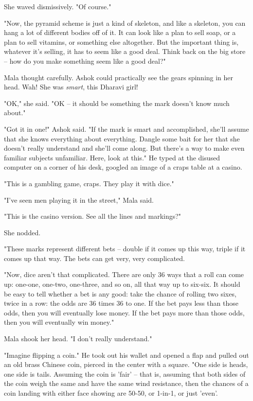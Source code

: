 She waved dismissively. "Of course."

"Now, the pyramid scheme is just a kind of skeleton, and like a
skeleton, you can hang a lot of different bodies off of it. It can
look like a plan to sell soap, or a plan to sell vitamins, or
something else altogether. But the important thing is, whatever
it's selling, it has to seem like a good deal. Think back on the
big store -- how do you make something seem like a good deal?"

Mala thought carefully. Ashok could practically see the gears
spinning in her head. Wah! She was \emph{smart}, this Dharavi
girl!

"OK," she said. "OK -- it should be something the mark doesn't know
much about."

"Got it in one!" Ashok said. "If the mark is smart and
accomplished, she'll assume that she knows everything about
everything. Dangle some bait for her that she doesn't really
understand and she'll come along. But there's a way to make even
familiar subjects unfamiliar. Here, look at this." He typed at the
disused computer on a corner of his desk, googled an image of a
craps table at a casino.

"This is a gambling game, craps. They play it with dice."

"I've seen men playing it in the street," Mala said.

"This is the casino version. See all the lines and markings?"

She nodded.

"These marks represent different bets -- double if it comes up this
way, triple if it comes up that way. The bets can get very, very
complicated.

"Now, dice aren't that complicated. There are only 36 ways that a
roll can come up: one-one, one-two, one-three, and so on, all that
way up to six-six. It should be easy to tell whether a bet is any
good: take the chance of rolling two sixes, twice in a row: the
odds are 36 times 36 to one. If the bet pays less than those odds,
then you will eventually lose money. If the bet pays more than
those odds, then you will eventually win money."

Mala shook her head. "I don't really understand."

"Imagine flipping a coin." He took out his wallet and opened a flap
and pulled out an old brass Chinese coin, pierced in the center
with a square. "One side is heads, one side is tails. Assuming the
coin is 'fair' -- that is, assuming that both sides of the coin
weigh the same and have the same wind resistance, then the chances
of a coin landing with either face showing are 50-50, or 1-in-1, or
just 'even'.

